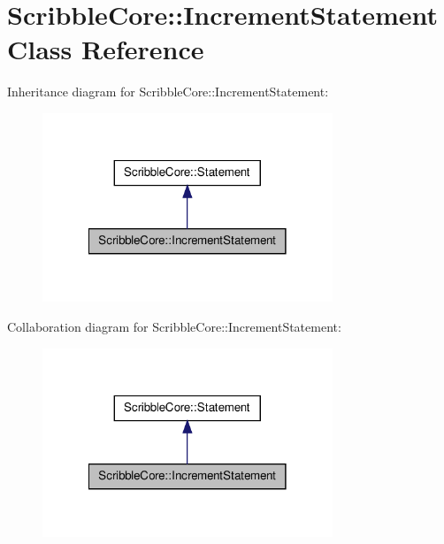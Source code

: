 \hypertarget{class_scribble_core_1_1_increment_statement}{\section{Scribble\-Core\-:\-:Increment\-Statement Class Reference}
\label{class_scribble_core_1_1_increment_statement}
}


Inheritance diagram for Scribble\-Core\-:\-:Increment\-Statement\-:
\nopagebreak
\begin{figure}[H]
\begin{center}
\leavevmode
\includegraphics[width=246pt]{class_scribble_core_1_1_increment_statement__inherit__graph}
\end{center}
\end{figure}


Collaboration diagram for Scribble\-Core\-:\-:Increment\-Statement\-:
\nopagebreak
\begin{figure}[H]
\begin{center}
\leavevmode
\includegraphics[width=246pt]{class_scribble_core_1_1_increment_statement__coll__graph}
\end{center}
\end{figure}
